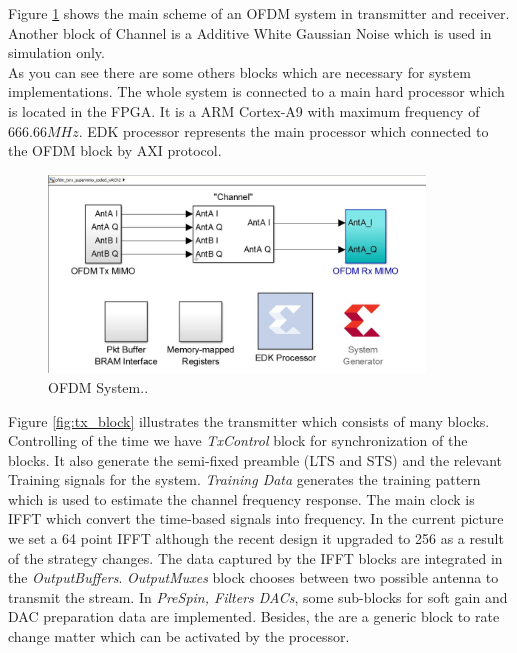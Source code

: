 Figure \ref{fig:ofdm_system} shows the main scheme of an OFDM system in transmitter and receiver. Another block of Channel is a Additive White Gaussian Noise which is used in simulation only.\\
As you can see there are some others blocks which are necessary for system implementations. The whole system is connected to a main hard processor which is located in the FPGA. It is a ARM Cortex-A9 with maximum frequency of $666.66 MHz$. EDK processor represents the main processor which connected to the OFDM block by AXI protocol. 

\begin{figure}[h!]
\centering
\includegraphics[width=10cm]{content/fig/system.JPG}
\caption{OFDM System..}
\label{fig:ofdm_system}
\end{figure}


Figure \ref{fig:tx_block} illustrates the transmitter which consists of many blocks. Controlling of the time we have \textit{TxControl} block for synchronization of the blocks. It also generate the semi-fixed preamble (LTS and STS) and the relevant Training signals for the system. \textit{Training Data} generates the training pattern which is used to estimate the channel frequency response.
The main clock is IFFT which convert the time-based signals into frequency. In the current picture we set a 64 point IFFT although the recent design it upgraded to 256 as a result of the strategy changes. The data captured by the IFFT blocks are integrated in the \textit{OutputBuffers}. \textit{OutputMuxes} block chooses between two possible antenna to transmit the stream. In \textit{PreSpin, Filters DACs}, some sub-blocks for soft gain and DAC preparation data are implemented. Besides, the are a generic block to rate change matter which can be activated by the processor.\\

